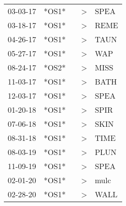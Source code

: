 \begin{supertabular}{p{0.07\textwidth}p{0.06\textwidth}p{0.02\textwidth}p{0.02\textwidth}p{0.06\textwidth}}
 03-03-17\textsuperscript{} &  *OS1* &   &  \textgreater &  SPEA\textsuperscript{} \\
 03-18-17\textsuperscript{} &  *OS1* &   &  \textgreater &  REME\textsuperscript{} \\
 04-26-17\textsuperscript{} &  *OS1* &   &  \textgreater &  TAUN\textsuperscript{} \\
 05-27-17\textsuperscript{} &  *OS1* &   &  \textgreater &   WAP\textsuperscript{} \\
 08-24-17\textsuperscript{} &  *OS2* &   &  \textgreater &  MISS\textsuperscript{} \\
 11-03-17\textsuperscript{} &  *OS1* &   &  \textgreater &  BATH\textsuperscript{} \\
 12-03-17\textsuperscript{} &  *OS1* &   &  \textgreater &  SPEA\textsuperscript{} \\
 01-20-18\textsuperscript{} &  *OS1* &   &  \textgreater &  SPIR\textsuperscript{} \\
 07-06-18\textsuperscript{} &  *OS1* &   &  \textgreater &  SKIN\textsuperscript{} \\
 08-31-18\textsuperscript{} &  *OS1* &   &  \textgreater &  TIME\textsuperscript{} \\
 08-03-19\textsuperscript{} &  *OS1* &   &  \textgreater &  PLUN\textsuperscript{} \\
 11-09-19\textsuperscript{} &  *OS1* &   &  \textgreater &  SPEA\textsuperscript{} \\
 02-01-20\textsuperscript{} &  *OS1* &   &  \textgreater &  mulc\textsuperscript{} \\
 02-28-20\textsuperscript{} &  *OS1* &   &  \textgreater &  WALL\textsuperscript{} \\
\end{supertabular}
